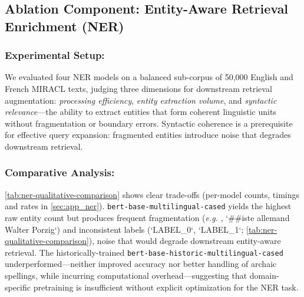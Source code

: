 \documentclass[11pt]{article}
\newcommand{\eg}{\textit{e.g. }}
\begin{document}
\subsection{Ablation Component: Entity-Aware Retrieval Enrichment (NER)}
\label{subsec:exp_ner}

\subsubsection{Experimental Setup:} We evaluated four NER models on a balanced sub-corpus of 50,000 English and French MIRACL texts, judging three dimensions for downstream retrieval augmentation: \textit{processing efficiency}, \textit{entity extraction volume}, and \textit{syntactic relevance}---the ability to extract entities that form coherent linguistic units without fragmentation or boundary errors. Syntactic coherence is a prerequisite for effective query expansion: fragmented entities introduce noise that degrades downstream retrieval.

\subsubsection{Comparative Analysis:} \cref{tab:ner-qualitative-comparison} shows clear trade-offs (per-model counts, timings and rates in \cref{sec:app_ner}). \texttt{bert-base-multilingual-cased} yields the highest raw entity count but produces frequent fragmentation (\eg, `\#\#iste allemand Walter Porzig`) and inconsistent labels (`LABEL\_0`, `LABEL\_1`; \cref{tab:ner-qualitative-comparison}), noise that would degrade downstream entity-aware retrieval. The historically-trained \texttt{bert-base-historic-multilingual-cased} underperformed---neither improved accuracy nor better handling of archaic spellings, while incurring computational overhead---suggesting that domain-specific pretraining is insufficient without explicit optimization for the NER task.

\begin{table}[t]
    \centering
    \caption{Qualitative comparison of entity extraction.}
    \label{tab:ner-qualitative-comparison}
\end{table}
\end{document}
